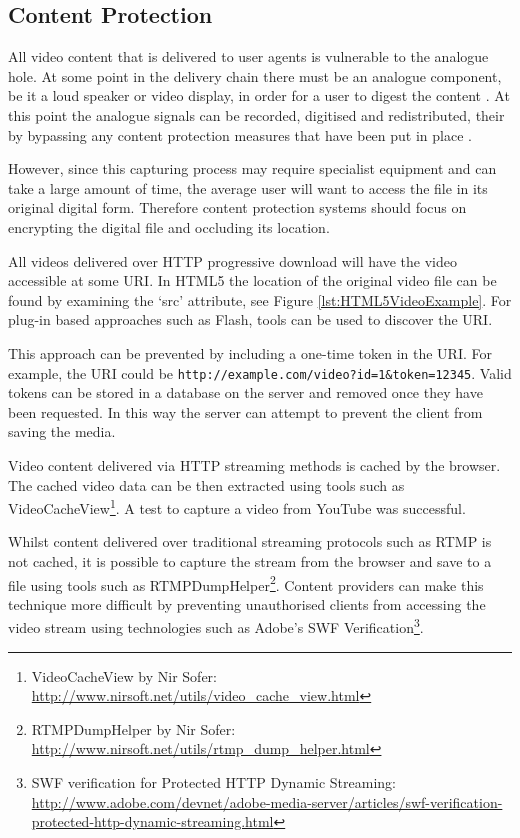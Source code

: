 \documentclass[journal]{IEEEtran}
\begin{document}
\subsection{Content Protection}
All video content that is delivered to user agents is vulnerable to the analogue hole. At some point in the delivery chain there must be an analogue component, be it a loud speaker or video display, in order for a user to digest the content \cite{inproceedings:closingTheAnalogueHole}. At this point the analogue signals can be recorded, digitised and redistributed, their by bypassing any content protection measures that have been put in place \cite{inproceedings:closingTheAnalogueHole}.

However, since this capturing process may require specialist equipment and can take a large amount of time, the average user will want to access the file in its original digital form. Therefore content protection systems should focus on encrypting the digital file and occluding its location.

All videos delivered over HTTP progressive download will have the video accessible at some URI. In HTML5 the location of the original video file can be found by examining the `src' attribute, see Figure \ref{lst:HTML5VideoExample}. For plug-in based approaches such as Flash, tools can be used to discover the URI.

This approach can be prevented by including a one-time token in the URI. For example, the URI could be \texttt{http://example.com/video?id=1\&token=12345}. Valid tokens can be stored in a database on the server and removed once they have been requested. In this way the server can attempt to prevent the client from saving the media.

Video content delivered via HTTP streaming methods is cached by the browser. The cached video data can be then extracted using tools such as VideoCacheView\footnote{VideoCacheView by Nir Sofer: \url{http://www.nirsoft.net/utils/video_cache_view.html}}. A test to capture a video from YouTube was successful.

Whilst content delivered over traditional streaming protocols such as RTMP is not cached, it is possible to capture the stream from the browser and save to a file using tools such as RTMPDumpHelper\footnote{RTMPDumpHelper by Nir Sofer: \url{http://www.nirsoft.net/utils/rtmp_dump_helper.html}}. Content providers can make this technique more difficult by preventing unauthorised clients from accessing the video stream using technologies such as Adobe's SWF Verification\footnote{SWF verification for Protected HTTP Dynamic Streaming: \url{http://www.adobe.com/devnet/adobe-media-server/articles/swf-verification-protected-http-dynamic-streaming.html}}. 
\end{document}
